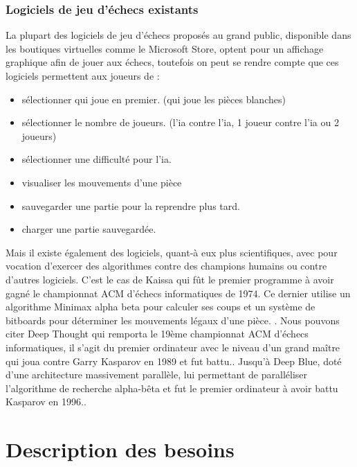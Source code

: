 \documentclass{article}
\begin{document}
\subsubsection{Logiciels de jeu d'échecs existants}
La plupart des logiciels de jeu d'échecs proposés au grand public, disponible dans les boutiques virtuelles comme le Microsoft Store, optent pour un affichage graphique afin de jouer aux échecs, toutefois on peut se rendre compte que ces logiciels permettent aux joueurs de :
\begin{itemize}
\item sélectionner qui joue en premier. (qui joue les pièces blanches)
\item sélectionner le nombre de joueurs. (l'ia contre l'ia, 1 joueur contre l'ia ou 2 joueurs)
\item sélectionner une difficulté pour l'ia.
\item visualiser les mouvements d'une pièce
\item sauvegarder une partie pour la reprendre plus tard. 
\item charger une partie sauvegardée.
\newline\newline
\end{itemize}
Mais il existe également des logiciels, quant-à eux plus scientifiques, avec pour vocation d'exercer  des algorithmes contre des champions humains ou contre d'autres logiciels.
\newline
C'est le cas de Kaissa qui fût le premier programme à avoir gagné le championnat ACM d'échecs informatiques de 1974. Ce dernier utilise un algorithme Minimax alpha beta \cite{KaissaAB} pour calculer ses coups et un système de bitboards pour déterminer les mouvements légaux d'une pièce. \cite{Kaissa}\cite{KaissaBitboard}\cite{RotatedBitBoards}.
\newline
Nous pouvons citer Deep Thought qui remporta le 19ème championnat ACM d'échecs informatiques, il s'agit du premier ordinateur avec le niveau d'un grand maître qui joua contre Garry Kasparov en 1989 et fut battu.\cite{Deep}. 
\newline
Jusqu'à Deep Blue, doté d'une architecture massivement parallèle, lui permettant de paralléliser l'algorithme de recherche alpha-bêta\cite{DeepSystem} et fut le premier ordinateur à avoir battu Kasparov en 1996.\cite{Deep}.

\section{Description des besoins}
\end{document}
